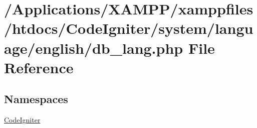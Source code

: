 \hypertarget{db__lang_8php}{}\section{/\+Applications/\+X\+A\+M\+P\+P/xamppfiles/htdocs/\+Code\+Igniter/system/language/english/db\+\_\+lang.php File Reference}
\label{db__lang_8php}
\subsection*{Namespaces}
\begin{DoxyCompactItemize}
\item 
 \mbox{\hyperlink{namespace_code_igniter}{Code\+Igniter}}
\end{DoxyCompactItemize}

